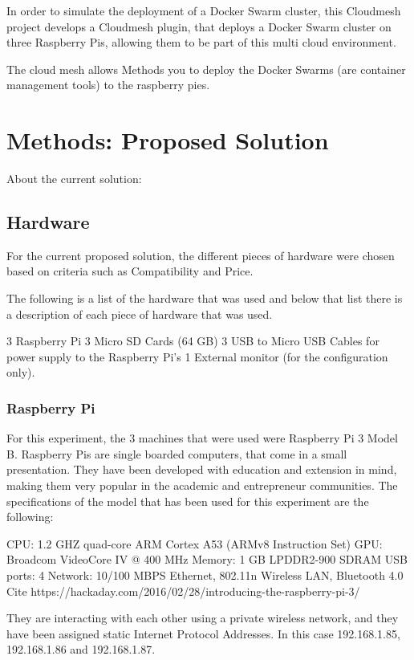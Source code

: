 \documentclass[sigconf]{acmart}
\begin{document}
	In order to simulate the deployment of a Docker Swarm cluster, this Cloudmesh project develops a Cloudmesh plugin, that deploys a Docker Swarm cluster on three Raspberry Pis, allowing them to be part of this multi cloud environment.
	
	The cloud mesh allows Methods you to deploy the Docker Swarms (are container management tools) to the raspberry pies.     
	
	
	
	\section{Methods: Proposed Solution}
	About the current solution:
	
	\subsection{Hardware}
	
	For the current proposed solution, the different pieces of hardware were chosen based on criteria such as Compatibility and Price.
	
	The following is a list of the hardware that was used  and below that list there is a description of each piece of hardware that was used.
	
	3 Raspberry Pi
	3 Micro SD Cards (64 GB)
	3 USB to Micro USB Cables for power supply to the Raspberry Pi’s
	1 External monitor (for the configuration only).
	
	\subsubsection{Raspberry Pi}
	
	For this experiment, the 3 machines that were used were Raspberry Pi 3 Model B.
	Raspberry Pis are single boarded computers, that come in a small presentation. They have been developed with education and extension in mind, making them very popular in the academic and entrepreneur communities. The specifications of the model that has been used for this experiment are the following:
	
	CPU: 1.2 GHZ quad-core ARM Cortex A53 (ARMv8 Instruction Set)
	GPU: Broadcom VideoCore IV @ 400 MHz
	Memory: 1 GB LPDDR2-900 SDRAM
	USB ports: 4
	Network: 10/100 MBPS Ethernet, 802.11n Wireless LAN, Bluetooth 4.0
	Cite {}  https://hackaday.com/2016/02/28/introducing-the-raspberry-pi-3/
	
	They are interacting with each other using a private wireless network, and they have been assigned static Internet Protocol Addresses. In this case 192.168.1.85, 192.168.1.86 and 192.168.1.87.
	
\end{document}
